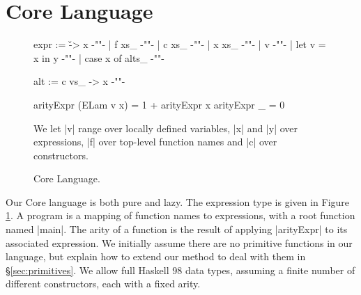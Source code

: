 \documentclass{sigplanconf}
\begin{document}
\section{Core Language}
\label{sec:core}

\begin{figure}
\ignore\begin{code}
expr  :=  \v -> x           {-""-}
      |   f xs_             {-""-}
      |   c xs_             {-""-}
      |   x xs_             {-""-}
      |   v                 {-""-}
      |   let v = x in y    {-""-}
      |   case x of alts_   {-""-}

alt   :=  c vs_ -> x        {-""-}
\end{code}
\begin{code}
arityExpr (ELam v x)  = 1 + arityExpr x
arityExpr _           = 0
\end{code}

We let |v| range over locally defined variables, |x| and |y| over expressions, |f| over top-level function names and |c| over constructors.
\caption{Core Language.}
\label{fig:core}
\end{figure}

Our Core language is both pure and lazy. The expression type is given in Figure \ref{fig:core}. A program is a mapping of function names to expressions, with a root function named |main|. The arity of a function is the result of applying |arityExpr| to its associated expression. We initially assume there are no primitive functions in our language, but explain how to extend our method to deal with them in \S\ref{sec:primitives}. We allow full Haskell 98 data types, assuming a finite number of different constructors, each with a fixed arity.
\end{document}
